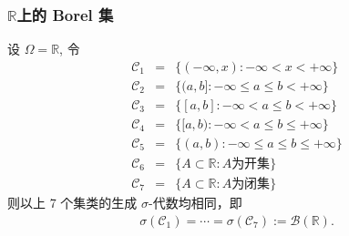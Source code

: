 \documentclass[Prob-All.tex]{subfiles}
\begin{document}
\begin{frame}
	\frametitle{$\mathbb{R}$上的 Borel 集}
	\begin{exam}
		设 $\Omega=\mathbb{R}$, 令
		\begin{eqnarray*}
			\mathcal{C}_1&=&\{(-\infty,x):-\infty<x<+\infty\}\\
			\mathcal{C}_2&=&\{(a,b]:-\infty\leq a\leq b<+\infty\}\\
			\mathcal{C}_3&=&\{[a,b]:-\infty< a\leq b<+\infty\}\\
			\mathcal{C}_4&=&\{[a,b):-\infty< a\leq b\leq+\infty\}\\
			\mathcal{C}_5&=&\{(a,b):-\infty\leq a\leq b\leq+\infty\}\\
			\mathcal{C}_6&=&\{A\subset\mathbb{R}:A\mbox{为开集}\}\\
			\mathcal{C}_7&=&\{A\subset\mathbb{R}:A\mbox{为闭集}\}
		\end{eqnarray*}
		则以上 7 个集类的生成 $\sigma$-代数均相同，即
		\begin{eqnarray*}
			\sigma(\mathcal{C}_1)=\cdots=\sigma(\mathcal{C}_7):=\mathcal{B}(\mathbb{R}).
		\end{eqnarray*}

	\end{exam}
\end{frame}
\end{document}
